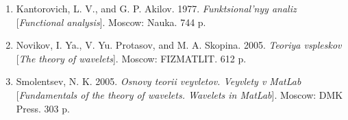 \documentclass[12pt, a4paper, oneside]{article}
\begin{document}
\begin{enumerate}
\item  Kantorovich, L. V., and G. P. Akilov. 1977. \textit{Funktsional'nyy analiz} [\textit{Functional analysis}]. Moscow: Nauka. 744 p.
\item   Novikov, I. Ya.,  V. Yu. Protasov, and M. A. Skopina. 2005. \textit{Teoriya vspleskov} [\textit{The theory of wavelets}]. Moscow: FIZMATLIT.  612 p.
\item  Smolentsev, N. K. 2005. \textit{Osnovy teorii veyvletov. Veyvlety v MatLab} [\textit{Fundamentals of the theory of wavelets. Wavelets in MatLab}].  Moscow: DMK Press. 303 p.
\end{enumerate}
\end{document}
